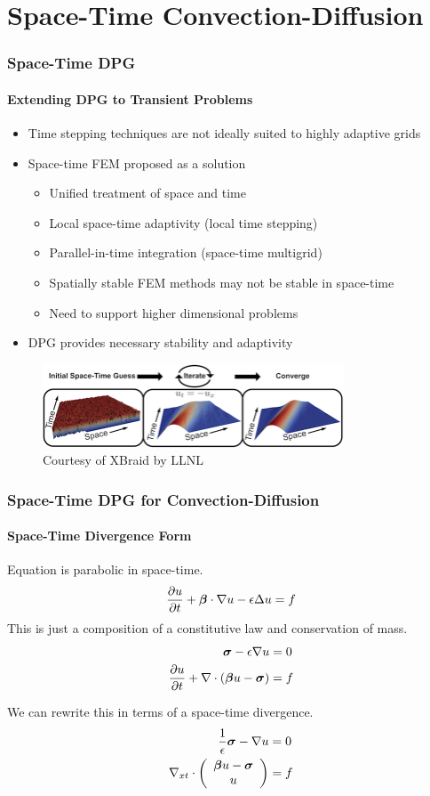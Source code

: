 \documentclass[18pt,xcolor=table]{beamer}
\begin{document}
\section{Space-Time Convection-Diffusion}
\begin{frame}[t]
\frametitle{Space-Time DPG}
\framesubtitle{Extending DPG to Transient Problems}
\begin{itemize}
  \item Time stepping techniques are not ideally suited to highly adaptive grids
  \item Space-time FEM proposed as a solution
  \begin{itemize}
    \item[\textcolor{green}{\Checkmark}] Unified treatment of space and time
    \item[\textcolor{green}{\Checkmark}] Local space-time adaptivity (local time stepping)
    \item[\textcolor{green}{\Checkmark}] Parallel-in-time integration (space-time multigrid)
    \item[\XSolidBrush] Spatially stable FEM methods may not be stable in space-time
    \item[\XSolidBrush] Need to support higher dimensional problems
  \end{itemize}
  \item DPG provides necessary stability and adaptivity
\end{itemize}
\begin{figure}[b]
\centering
\includegraphics[width=0.8\textwidth]{Schematics/XBraid}
\\
Courtesy of XBraid by LLNL
\end{figure}
\end{frame}


\begin{frame}[t]
\frametitle{Space-Time DPG for Convection-Diffusion}
\framesubtitle{Space-Time Divergence Form}
Equation is parabolic in space-time.
\[
\frac{\partial u}{\partial t}+\boldsymbol\beta\cdot\nabla u-\epsilon\Delta u=f
\]
This is just a composition of a constitutive law and conservation of mass.
\begin{align*}
\boldsymbol\sigma-\epsilon\nabla u&=0\\
\frac{\partial u}{\partial t}+\nabla\cdot\left( \boldsymbol\beta u-\boldsymbol\sigma \right)&=f
\end{align*}

We can rewrite this in terms of a space-time divergence.
\begin{align*}
\frac{1}{\epsilon}\boldsymbol\sigma-\nabla u &=0\\
\nabla_{xt}\cdot\left( \begin{array}{c} \boldsymbol\beta u-\boldsymbol\sigma\\ u\\ \end{array} \right)&=f
\end{align*}
\end{frame}
\end{document}
